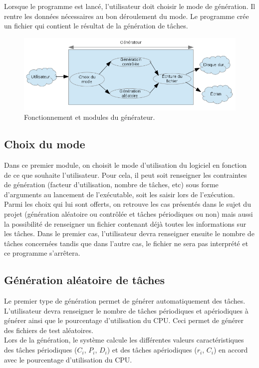 	
		Lorsque le programme est lancé, l’utilisateur doit choisir le mode de génération. Il rentre les données nécessaires au bon déroulement du mode. Le programme crée un fichier qui contient le résultat de la génération de tâches.
		
			\begin{figure}[!h]
				\centering
				\includegraphics[scale=0.9]{img/schema_gen.png}
				\caption{Fonctionnement et modules du générateur.}
			\end{figure}
			\FloatBarrier
		    
			\subsection{Choix du mode}
				Dans ce premier module, on choisit le mode d’utilisation du logiciel en fonction de ce que souhaite l’utilisateur. Pour cela, il peut soit renseigner les contraintes de génération (facteur d'utilisation, nombre de tâches, etc) sous forme d’arguments au lancement de l'exécutable, soit les saisir lors de l'exécution.\\

				Parmi les choix qui lui sont offerts, on retrouve les cas présentés dans le sujet du projet (génération aléatoire ou contrôlée et tâches périodiques ou non) mais aussi la possibilité de renseigner un fichier contenant déjà toutes les informations sur les tâches. Dans le premier cas, l’utilisateur devra renseigner ensuite le nombre de tâches concernées tandis que dans l’autre cas, le fichier ne sera pas interprété et ce programme s’arrêtera.


			\subsection{Génération aléatoire de tâches}
				Le premier type de génération permet de générer automatiquement des tâches. L'utilisateur devra renseigner le nombre de tâches périodiques et apériodiques à générer ainsi que le pourcentage d'utilisation du CPU. Ceci permet de générer des fichiers de test aléatoires.\\
				Lors de la génération, le système calcule les différentes valeurs caractéristiques des tâches périodiques ($C_i$, $P_i$, $D_i$) et des tâches apériodiques ($r_i$, $C_i$) en accord avec le pourcentage d'utilisation du CPU. 

